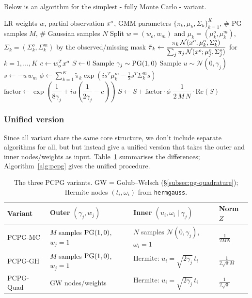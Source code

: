 Below is an algorithm for the simplest - fully Monte Carlo - variant.

\begin{algorithm}[H]
\caption{PCPG: expected sigmoid under a GMM, full Monte Carlo}
\label{alg:pcpg-mc}
\begin{algorithmic}[1]
\Require LR weights $w$, partial observation $x^o$,
GMM parameters $\{\pi_k, \mu_k, \Sigma_k\}_{k=1}^{K}$,
\# PG samples $M$, \# Gaussian samples $N$
\State Split $w = (w_o, w_m)$ and $\mu_k = (\mu_k^o, \mu_k^m)$, $\Sigma_k = (\Sigma_k^o, \Sigma_k^m)$ by the observed/missing mask
\State $\tilde{\pi}_k \gets \dfrac{\pi_k \, \mathcal{N}(x^o;\mu_k^o,\Sigma_k^o)}{\sum_{j}\pi_j \,\mathcal{N}(x^o;\mu_j^o,\Sigma_j^o)}$ \hfill for $k=1,\dots,K$
\State $c \gets w_o^T x^o$
\State $S \gets 0$
  \State Sample $\gamma_j \sim \mathrm{PG}(1, 0)$
    \State Sample $u \sim \mathcal{N}(0, \gamma_j)$
    \State $s \gets -u\, w_m$
    \State $\phi \gets \sum_{k=1}^{K} \tilde{\pi}_k \exp \!\left( i s^T \mu_k^m - \tfrac{1}{2} s^T \Sigma_k^m s \right)$
    \State $\mathrm{factor} \gets \exp \!\left( \dfrac{1}{8\gamma_j} + i u \left( \dfrac{1}{2\gamma_j} - c \right) \right)$
    \State $S \gets S + \mathrm{factor} \cdot \phi$
  \EndFor
\EndFor
\State \Return $\dfrac{1}{2\,M\,N} \cdot \mathrm{Re}(S)$
\end{algorithmic}
\end{algorithm}

\subsubsection{Unified version}

Since all variant share the same core structure, we don't include separate algorithms for all, but 
but instead give a unified version that takes the outer and inner nodes/weights as input.
Table~\ref{tab:pcpg-variants} summarises the differences;
Algorithm~\ref{alg:pcpg} gives the unified procedure.

\begin{table}[H]
\centering
\small
\begin{tabular}{llll}
\hline
\textbf{Variant} & \textbf{Outer} $(\gamma_j, w_j)$ & \textbf{Inner} $(u_i, \omega_i \mid \gamma_j)$ & \textbf{Norm} $Z$ \\
\hline
PCPG-MC   & $M$ samples $\mathrm{PG}(1,0)$, $w_j{=}1$ & $N$ samples $\mathcal{N}(0,\gamma_j)$, $\omega_i{=}1$ & $\frac{1}{2MN}$ \\[4pt]
PCPG-GH   & $M$ samples $\mathrm{PG}(1,0)$, $w_j{=}1$ & Hermite: $u_i{=}\sqrt{2\gamma_j}\,t_i$ & $\frac{1}{2\sqrt{\pi}M}$ \\[4pt]
PCPG-Quad & GW nodes/weights                   & Hermite: $u_i{=}\sqrt{2\gamma_j}\,t_i$ & $\frac{1}{2\sqrt{\pi}}$ \\
\hline
\end{tabular}
\caption{The three PCPG variants. GW = Golub--Welsch (\S\ref{subsec:pg-quadrature}); Hermite nodes $(t_i,\omega_i)$ from \texttt{hermgauss}.}
\label{tab:pcpg-variants}
\end{table}

